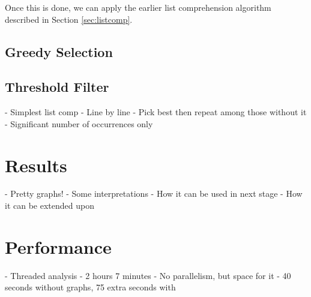 Once this is done, we can apply the earlier list comprehension algorithm described in Section \ref{sec:listcomp}.

\subsection{Greedy Selection}

\subsection{Threshold Filter}


- Simplest list comp
- Line by line
- Pick best then repeat among those without it
- Significant number of occurrences only

\section{Results}
- Pretty graphs!
- Some interpretations
- How it can be used in next stage
- How it can be extended upon

\section{Performance}
- Threaded analysis
- 2 hours 7 minutes
- No parallelism, but space for it
- 40 seconds without graphs, 75 extra seconds with




